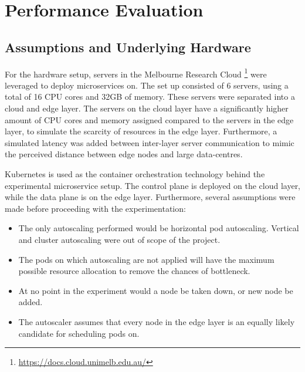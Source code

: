 \clearpage

\def\chaptertitle{Performance Evaluation}

\lhead{\emph{\chaptertitle}}

\chapter{\chaptertitle}
\label{ch:performance-evaluation}

\section{Assumptions and Underlying Hardware}
\label{sec:ch4-hardware-assumptions}

For the hardware setup, servers in the Melbourne Research Cloud \footnote{\url{https://docs.cloud.unimelb.edu.au/}} were leveraged to deploy microservices on. The set up consisted of 6 servers, using a total of 16 CPU cores and 32GB of memory. These servers were separated into a cloud and edge layer. The servers on the cloud layer have a significantly higher amount of CPU cores and memory assigned compared to the servers in the edge layer, to simulate the scarcity of resources in the edge layer. Furthermore, a simulated latency was added between inter-layer server communication to mimic the perceived distance between edge nodes and large data-centres.\par

Kubernetes is used as the container orchestration technology behind the experimental microservice setup. The control plane is deployed on the cloud layer, while the data plane is on the edge layer. Furthermore, several assumptions were made before proceeding with the experimentation:

\begin{itemize}
    \item The only autoscaling performed would be horizontal pod autoscaling. Vertical and cluster autoscaling were out of scope of the project.
    \item The pods on which autoscaling are not applied will have the maximum possible resource allocation to remove the chances of bottleneck.
    \item At no point in the experiment would a node be taken down, or new node be added.
    \item The autoscaler assumes that every node in the edge layer is an equally likely candidate for scheduling pods on.
\end{itemize}
